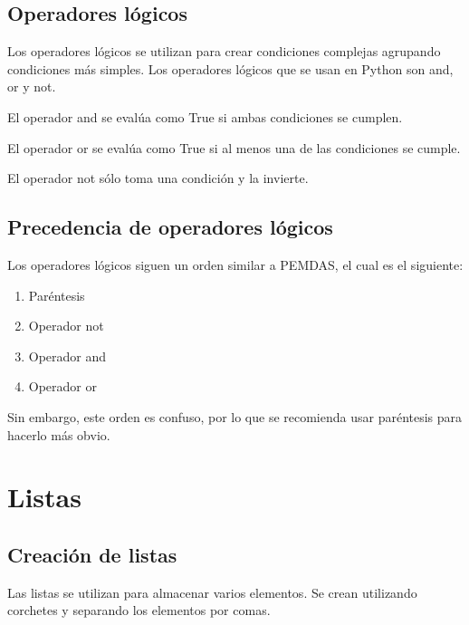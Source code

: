 \documentclass{report}
\begin{document}
\section{Operadores lógicos}

Los operadores lógicos se utilizan para crear condiciones complejas agrupando condiciones más simples. Los operadores lógicos que se usan en Python son and, or y not.

El operador and se evalúa como True si ambas condiciones se cumplen.


El operador or se evalúa como True si al menos una de las condiciones se cumple.


El operador not sólo toma una condición y la invierte.


\section{Precedencia de operadores lógicos}

Los operadores lógicos siguen un orden similar a PEMDAS, el cual es el siguiente:

\begin{enumerate}
  \item Paréntesis
  \item Operador not
  \item Operador and
  \item Operador or
\end{enumerate}

Sin embargo, este orden es confuso, por lo que se recomienda usar paréntesis para hacerlo más obvio.


\clearpage\chapter{Listas}

\section{Creación de listas}

Las listas se utilizan para almacenar varios elementos. Se crean utilizando corchetes y separando los elementos por comas.

\end{document}
